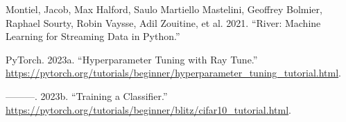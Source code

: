 \documentclass[
  letterpaper,
  DIV=11,
  numbers=noendperiod]{scrreprt}
\newlength{\cslhangindent}
\newlength{\cslentryspacingunit} %
\newenvironment{CSLReferences}[2] %
 {%
  \setlength{\parindent}{0pt}
  \ifodd #1
  \let\oldpar\par
  \def\par{\hangindent=\cslhangindent\oldpar}
  \fi
  \setlength{\parskip}{#2\cslentryspacingunit}
 }%
 {}
\begin{document}
\begin{CSLReferences}{1}{0}
\leavevmode{}%
Montiel, Jacob, Max Halford, Saulo Martiello Mastelini, Geoffrey
Bolmier, Raphael Sourty, Robin Vaysse, Adil Zouitine, et al. 2021.
{``River: Machine Learning for Streaming Data in Python.''}

\leavevmode{}%
PyTorch. 2023a. {``Hyperparameter Tuning with Ray Tune.''}
\url{https://pytorch.org/tutorials/beginner/hyperparameter_tuning_tutorial.html}.

\leavevmode{}%
---------. 2023b. {``Training a Classifier.''}
\url{https://pytorch.org/tutorials/beginner/blitz/cifar10_tutorial.html}.

\end{CSLReferences}
\end{document}
